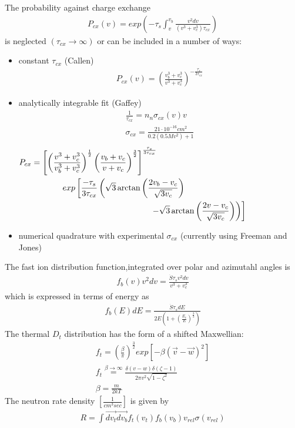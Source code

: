 \documentclass{slides}
\newcommand{\beq}{\begin{eqnarray}}
\newcommand{\eeq}{\end{eqnarray}}
\begin{document}
	The probability against charge exchange  
	 \beq
           P_{cx}(v)=  exp\left(-\tau_s \int_{v}^{v_b}\frac{v^2dv}
              {(v^3+v_c^3)\tau_{cx}}\right) 
         \eeq
         is neglected $(\tau_{cx} \rightarrow \infty)$  or can be included
         in a number of ways:
         \begin{itemize}
          \item  constant $\tau_{cx}$ (Callen)
            \beq
               P_{cx}(v)=\left(\frac{v_b^3+v_c^3}{v^3+v_c^3}\right)
                      ^{-\frac{\tau_s}{3\tau_{cx}}}
	    \eeq
          \item analytically integrable fit (Gaffey)
             \begin{eqnarray*}
                \frac{1}{\tau_{cx}}=n_n\sigma_{cx}(v)v  \\
    \sigma_{cx}=\frac{ 21\cdot10^{-16} cm^2}{0.2(0.5Mv^2)+1} 
              \end{eqnarray*}
              \begin{eqnarray}
          P_{cx}=\left[\left(\frac{v^3+v_c^3}{v_b^3+v_c^3}
                     \right)^{\frac{1}{2}}   
                     \left(\frac{v_b+v_c}
                    {v+v_c}\right)^{\frac{3}{2}}\right]
               ^{\frac{\tau_s}{3\tau_{cx}}} \hspace{2.5in}  \nonumber \\
                   exp\left[\frac{-\tau_s}{3\tau_{cx}} \left( 
  \sqrt{3}\arctan{\left(\frac{2v_b-v_c}{\sqrt{3v_c}}\right)}
             \right.\right. \hspace{2.0in} \nonumber \\
   \left.\left. -\sqrt{3}\arctan{\left(\frac{2v-v_c}{\sqrt{3v_c}}\right)}
               \right)\right] \hspace{1.0in}
             \end{eqnarray}
           \item numerical quadrature with experimental $\sigma_{cx}$
                (currently using Freeman and Jones)
         \end{itemize}
	The fast ion distribution function,integrated over polar and
	azimutahl angles is 
          \beq
           f_b(v)v^2dv=\frac{\dot S \tau_s v^2dv}{ v^3+v_c^3}
          \eeq
	which is expressed in terms of energy as
	 \beq
             f_b(E)dE=\frac{ \dot S \tau_s dE}{2E(1+{\left(
                        \frac{E_c}{E}\right)}^{\frac{3}{2}})}
         \eeq
           The thermal $D_t $ distribution has the form of a shifted
 	   Maxwellian:
           \begin{eqnarray}
	    f_t=\left({\frac {\beta}{\pi}}\right)^{\frac{3}{2}} exp\left[-\beta
                          (\vec{v}-\vec{w})^2\right] \nonumber\\
            f_t \stackrel{\beta \rightarrow \infty}=
            \frac{\delta (v-w) \delta(\zeta - 1)}{2\pi v^2
                                 \sqrt{1-\zeta^2}}  \\
            \beta = \frac{m}{2kT} \nonumber
           \end{eqnarray}
	  The neutron rate density $[\frac{1}{cm^3sec}]$ is given by
           \beq
           R=\int \vec{dv_t}\vec{dv_b}f_t(v_t)f_b(v_b)v_{rel}\sigma({v_{rel}}) 
           \eeq
\end{document}
